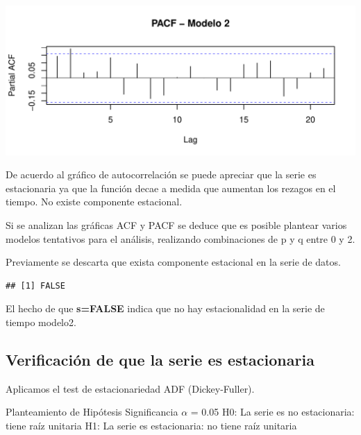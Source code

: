 \documentclass[
  11pt,
]{article}
\newenvironment{Shaded}{\begin{snugshade}}{\end{snugshade}}
\newcommand{\KeywordTok}[1]{\textcolor[rgb]{0.13,0.29,0.53}{\textbf{#1}}}
\newcommand{\NormalTok}[1]{#1}
\newcommand{\OperatorTok}[1]{\textcolor[rgb]{0.81,0.36,0.00}{\textbf{#1}}}
\newcommand{\StringTok}[1]{\textcolor[rgb]{0.31,0.60,0.02}{#1}}
\begin{document}
\begin{center}\includegraphics[width=0.9\linewidth]{RmdFigs/pacfM2-1} \end{center}

De acuerdo al gráfico de autocorrelación se puede apreciar que la serie
es estacionaria ya que la función decae a medida que aumentan los
rezagos en el tiempo. No existe componente estacional.

Si se analizan las gráficas ACF y PACF se deduce que es posible plantear
varios modelos tentativos para el análisis, realizando combinaciones de
p y q entre 0 y 2.

Previamente se descarta que exista componente estacional en la serie de
datos.

\begin{Shaded}
\end{Shaded}

\begin{verbatim}
## [1] FALSE
\end{verbatim}

El hecho de que \textbf{s=FALSE} indica que no hay estacionalidad en la
serie de tiempo modelo2.

\hypertarget{verificaciuxf3n-de-que-la-serie-es-estacionaria}{%
\subsection{Verificación de que la serie es
estacionaria}\label{verificaciuxf3n-de-que-la-serie-es-estacionaria}}

Aplicamos el test de estacionariedad ADF (Dickey-Fuller).

Planteamiento de Hipótesis Significancia \(\alpha\) = 0.05 H0: La serie
es no estacionaria: tiene raíz unitaria H1: La serie es estacionaria: no
tiene raíz unitaria
\end{document}
